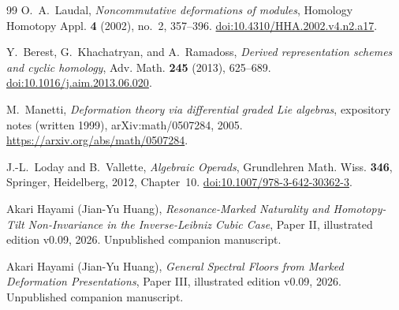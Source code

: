 \documentclass[11pt]{amsart}
\begin{document}
\begin{thebibliography}{99}
O.~A.~Laudal,
\emph{Noncommutative deformations of modules},
Homology Homotopy Appl. \textbf{4} (2002), no.~2, 357--396.
\href{https://doi.org/10.4310/HHA.2002.v4.n2.a17}{doi:10.4310/HHA.2002.v4.n2.a17}.

Y.~Berest, G.~Khachatryan, and A.~Ramadoss,
\emph{Derived representation schemes and cyclic homology},
Adv. Math. \textbf{245} (2013), 625--689.
\href{https://doi.org/10.1016/j.aim.2013.06.020}{doi:10.1016/j.aim.2013.06.020}.


M.~Manetti,
\emph{Deformation theory via differential graded Lie algebras},
expository notes (written 1999), arXiv:math/0507284, 2005.
\url{https://arxiv.org/abs/math/0507284}.

J.-L.~Loday and B.~Vallette,
\emph{Algebraic Operads}, Grundlehren Math. Wiss. \textbf{346},
Springer, Heidelberg, 2012, Chapter~10.
\href{https://doi.org/10.1007/978-3-642-30362-3}{doi:10.1007/978-3-642-30362-3}.

Akari Hayami (Jian-Yu Huang),
\emph{Resonance-Marked Naturality and Homotopy-Tilt Non-Invariance in the Inverse-Leibniz Cubic Case},
Paper II, illustrated edition v0.09, 2026. Unpublished companion manuscript.

Akari Hayami (Jian-Yu Huang),
\emph{General Spectral Floors from Marked Deformation Presentations},
Paper III, illustrated edition v0.09, 2026. Unpublished companion manuscript.
\end{thebibliography}
\end{document}
